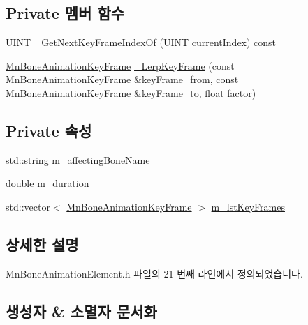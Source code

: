 \subsection*{Private 멤버 함수}
\begin{DoxyCompactItemize}
\item 
U\+I\+NT \hyperlink{class_m_n_l_1_1_mn_bone_animation_element_ae0385d67d5f8663fd2a7e398e8e2f91e}{\+\_\+\+Get\+Next\+Key\+Frame\+Index\+Of} (U\+I\+NT current\+Index) const
\item 
\hyperlink{struct_m_n_l_1_1_mn_bone_animation_key_frame}{Mn\+Bone\+Animation\+Key\+Frame} \hyperlink{class_m_n_l_1_1_mn_bone_animation_element_a3e789fbdea899e545eb5ff7a3aa41961}{\+\_\+\+Lerp\+Key\+Frame} (const \hyperlink{struct_m_n_l_1_1_mn_bone_animation_key_frame}{Mn\+Bone\+Animation\+Key\+Frame} \&key\+Frame\+\_\+from, const \hyperlink{struct_m_n_l_1_1_mn_bone_animation_key_frame}{Mn\+Bone\+Animation\+Key\+Frame} \&key\+Frame\+\_\+to, float factor)
\end{DoxyCompactItemize}
\subsection*{Private 속성}
\begin{DoxyCompactItemize}
\item 
std\+::string \hyperlink{class_m_n_l_1_1_mn_bone_animation_element_af8bc9d470a35c8d41283660baa36ecaf}{m\+\_\+affecting\+Bone\+Name}
\item 
double \hyperlink{class_m_n_l_1_1_mn_bone_animation_element_ad6427e5172eb3a5754f133dbda4fa43c}{m\+\_\+duration}
\item 
std\+::vector$<$ \hyperlink{struct_m_n_l_1_1_mn_bone_animation_key_frame}{Mn\+Bone\+Animation\+Key\+Frame} $>$ \hyperlink{class_m_n_l_1_1_mn_bone_animation_element_adb31ea7e47450a243d3b87ceadab86d0}{m\+\_\+lst\+Key\+Frames}
\end{DoxyCompactItemize}


\subsection{상세한 설명}


Mn\+Bone\+Animation\+Element.\+h 파일의 21 번째 라인에서 정의되었습니다.



\subsection{생성자 \& 소멸자 문서화}
\mbox{\label{class_m_n_l_1_1_mn_bone_animation_element_a17a71367d88886a9a1a06ce72cc3ae3f}} 

